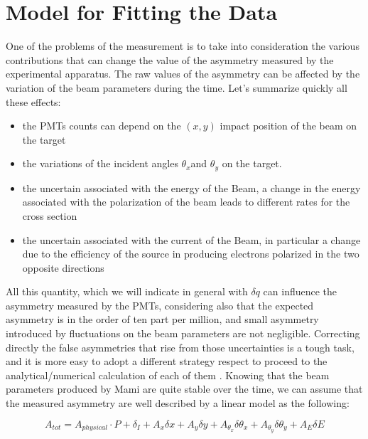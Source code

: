 \section{Model for Fitting the Data} \label{Model}
\bigskip

One of the problems of the measurement is to take into consideration the various contributions that can change the value of the asymmetry measured by the experimental apparatus. The raw values of the asymmetry can be affected by the variation of the beam parameters during the time. Let's summarize quickly all these effects:
\begin{itemize}
\item the PMTs counts  can depend on the $(x,y)$ impact position of the beam on the target
\item the variations of the incident angles $\theta_{x}$and $\theta_{y}$ on the target.
\item the uncertain associated with the energy of the Beam, a change in the energy associated with the polarization of the beam leads to different rates for the cross section
\item the uncertain associated with the current of the Beam, in particular a change due to the 
efficiency of the source in producing electrons polarized in the two opposite directions
\end{itemize}

All this quantity, which we will indicate in general with $\delta q$ can influence the asymmetry measured by the PMTs, considering also that the expected asymmetry is in the order of ten part per million, and small asymmetry introduced by fluctuations on the beam parameters are not negligible. Correcting directly the false asymmetries that rise from those uncertainties is a tough task, and it is more easy to adopt a different strategy respect to proceed to the analytical/numerical calculation of each of them . Knowing that the beam parameters produced by Mami are quite stable over the time, we can assume that the measured asymmetry are well described by a linear model as the following:

\begin{equation}
A_{tot} = A_{physical} \cdot P + \delta_{I} + A_{x} \delta x + A_{y} \delta y + A_{\theta_{x}} \delta \theta_{x} + A_{\theta_{y}} \delta \theta_{y}+ A_{E} \delta E 
\end{equation}

